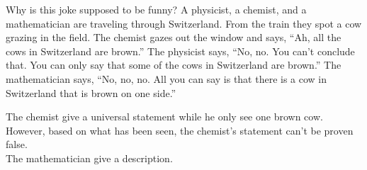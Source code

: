 \documentclass[11pt, a4paper, UTF8]{ctexart}
\begin{document}
\begin{problem}[UD:4.9]
Why is this joke supposed to be funny? A physicist, a chemist, and a mathematician are traveling through Switzerland. From the train they spot a cow grazing in the field. The chemist gazes out the window and says, “Ah, all the cows in Switzerland are brown.” The physicist says, “No, no. You can’t conclude that. You can only say that some of the cows in Switzerland are brown.” The mathematician says, “No, no, no. All you can say is that there is a cow in Switzerland that is brown on one side.”
\end{problem}

\begin{solution}
The chemist give a universal statement while he only see one brown cow.\\
However, based on what has been seen, the chemist's statement can't be proven false.\\
The mathematician give a description.

\end{solution}
\end{document}
